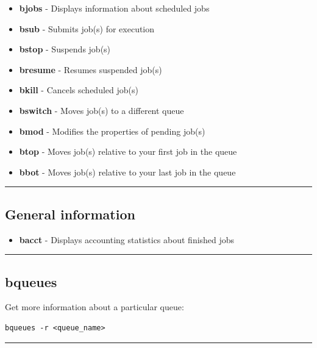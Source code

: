 \documentclass[11pt]{article}
\providecommand{\tightlist}{%
      \setlength{\itemsep}{0pt}\setlength{\parskip}{0pt}}
\begin{document}
\begin{itemize}
\item
  \textbf{bjobs} - Displays information about scheduled jobs
\item
  \textbf{bsub} - Submits job(s) for execution
\item
  \textbf{bstop} - Suspends job(s)
\item
  \textbf{bresume} - Resumes suspended job(s)
\item
  \textbf{bkill} - Cancels scheduled job(s)
\item
  \textbf{bswitch} - Moves job(s) to a different queue
\item
  \textbf{bmod} - Modifies the properties of pending job(s)
\item
  \textbf{btop} - Moves job(s) relative to your first job in the queue
\item
  \textbf{bbot} - Moves job(s) relative to your last job in the queue
\end{itemize}

    \begin{center}\rule{0.5\linewidth}{\linethickness}\end{center}

    \subsection{General information}\label{general-information}

\begin{itemize}
\tightlist
\item
  \textbf{bacct} - Displays accounting statistics about finished jobs
\end{itemize}

    \begin{center}\rule{0.5\linewidth}{\linethickness}\end{center}

    \subsection{bqueues}\label{bqueues}

Get more information about a particular queue:

\begin{verbatim}
bqueues -r <queue_name>
\end{verbatim}

    \begin{center}\rule{0.5\linewidth}{\linethickness}\end{center}
\end{document}
